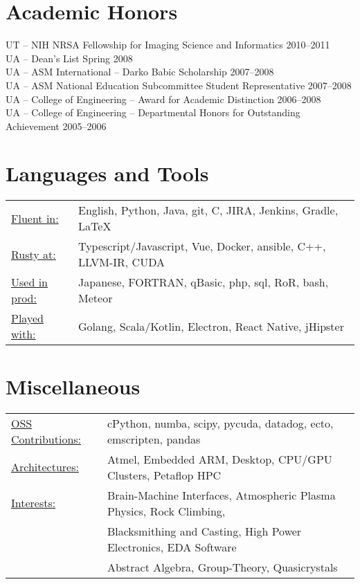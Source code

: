 \documentclass{res}
\begin{document}
\begin{resume}
\section{Academic Honors}
UT -- NIH NRSA Fellowship for Imaging Science and Informatics \hfill 2010--2011 \\
UA -- Dean’s List \hfill Spring 2008 \\
UA -- ASM International -- Darko Babic Scholarship \hfill 2007--2008 \\
UA -- ASM National Education Subcommittee Student Representative \hfill 2007--2008 \\
UA -- College of Engineering -- Award for Academic Distinction \hfill 2006--2008 \\
UA -- College of Engineering -- Departmental Honors for Outstanding Achievement \hfill 2005--2006

\section{Languages and Tools}
 \begin{tabular}{l p{5.5in}}
   \underline{Fluent in:}    & English, Python, Java, git, C, JIRA, Jenkins, Gradle, \LaTeX \\
   \underline{Rusty at:}     & Typescript/Javascript, Vue, Docker, ansible, C++, LLVM-IR, CUDA \\
   \underline{Used in prod:} & Japanese, FORTRAN, qBasic, php, sql, RoR, bash, Meteor \\
   \underline{Played with:}  & Golang, Scala/Kotlin, Electron, React Native, jHipster
 \end{tabular}

\section{Miscellaneous}
  \begin{tabular}{l p{5.5in}}
    \underline{OSS Contributions:} & cPython, numba, scipy, pycuda, datadog, ecto, emscripten, pandas  \\
    \underline{Architectures:}     & Atmel, Embedded ARM, Desktop, CPU/GPU Clusters, Petaflop HPC \\
    \underline{Interests:}         & Brain-Machine Interfaces, Atmospheric Plasma Physics, Rock Climbing, \\
                                   & Blacksmithing and Casting, High Power Electronics, EDA Software \\
                                   & Abstract Algebra, Group-Theory, Quasicrystals
 \end{tabular}

\end{resume}
\end{document}
